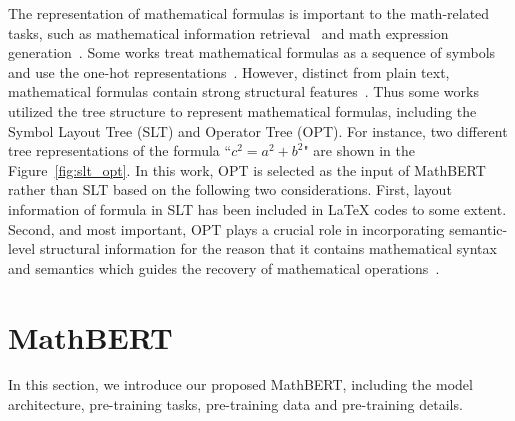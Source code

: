 \documentclass{article}
\begin{document}
The representation of mathematical formulas is important to the math-related tasks, such as mathematical information retrieval~\cite{wang2015wikimirs,yuan2016mathematical,TangentS,jiang2018mathematics,TangentCFT} and math expression generation~\cite{yuanke,zhang2020tree}. Some works treat mathematical formulas as a sequence of symbols and use the one-hot representations~\cite{Topiceq,yuan2016mathematical}. However, distinct from plain text, mathematical formulas contain strong structural features~\cite{TangentCFT,yuanke}. Thus some works~\cite{wang2015wikimirs,yuan2016mathematical,jiang2018mathematics,TangentS,TangentCFT} utilized the tree structure to represent mathematical formulas, including the Symbol Layout Tree (SLT) and Operator Tree (OPT). For instance, two different tree representations of the formula ``$c^2=a^2+b^2$" are shown in the Figure~\ref{fig:slt_opt}. In this work, OPT is selected as the input of MathBERT rather than SLT based on the following two considerations. First, layout information of formula in SLT has been included in \LaTeX{} codes to some extent. Second, and most important, OPT plays a crucial role in incorporating semantic-level structural information for the reason that it contains mathematical syntax and semantics which guides the recovery of mathematical operations~\cite{zanibbi2012recognition}.

\begin{figure*}[t]
    \centering
    \vskip -0.1in
    \caption{An illustration of the architecture of MathBERT.
    The two figures on the left indicate the source text extracted from scientific articles which consists of mathematical formula and its context, and the associated OPT translated from \LaTeX{} code of the formula. Raw text is tokenized and concatenated with \LaTeX{} tokens and operators as the input. In the pre-training stage, we randomly mask the input and employ three pre-training tasks (MLM,CCP,MSP) to train MathBERT. To learn structure-aware information of formula, we utilize the structure of OPT to modify attention mask matrix in Transformers and train MathBERT with MSP pre-training task.}
    \label{fig:architecture}
\end{figure*}

\section{MathBERT}

In this section, we introduce our proposed MathBERT, including the model architecture, pre-training tasks, pre-training data and pre-training details.
\end{document}
